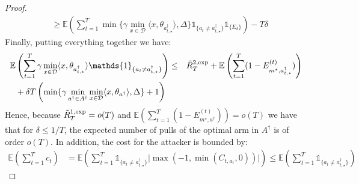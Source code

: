 \begin{proof}
\begin{align*}
    &\geq \mathbb{E}\left(\sum_{t=1}^{T} \min\{\gamma\min_{x\in\mathcal{D}} \langle x, \theta_{a^{\dagger}_{t,\star}}\rangle, \Delta\} \mathds{1}_{\{a_{t}\neq a^{\dagger}_{t,\star}\}}\mathds{1}_{\{E_{\delta}\}}\right)-T\delta
\end{align*}
Finally, putting everything together we have:
\begin{align*}
    \mathbb{E}&\left(\sum_{t=1}^{T} \gamma\min_{x\in\mathcal{D}} \langle x, \theta_{a^{\dagger}_{t,\star}}\rangle \mathds{1}_{\{a_{t}\neq a^{\dagger}_{t,\star}\}}\right) \leq &\Tilde{R}_{T}^{2,\text{exp}} + \mathbb{E}\left(\sum_{t=1}^{T}(1 - E_{m^{\star}, a^{\dagger}_{t,\star}}^{(t)})\right)\\
     &+ \delta T \left(\min\{\gamma\min_{a^{\dagger}\in A^{\dagger}}\min_{x\in\mathcal{D}} \langle x, \theta_{a^{\dagger}}\rangle, \Delta\} +1\right)
\end{align*}
Hence, because $\Tilde{R}_{T}^{1,\text{exp}} = o(T)$ and $\mathbb{E}\left(\sum_{t=1}^{T}(1 - E_{m^{\star}, a^{\dagger}}^{(t)})\right) = o(T)$ we have that for $\delta \leq 1/T$, the expected number of pulls of the optimal arm in $A^{\dagger}$ is of order $o(T)$. In addition, the cost for the attacker is bounded by: 
\begin{align*}
\mathbb{E}\left(\sum_{t=1}^{T} c_{t}\right) &= \mathbb{E}\left(\sum_{t=1}^{T} \mathds{1}_{\{a_{t}\neq a^{\dagger}_{t,\star}\}} \big|\max(-1, \min(C_{t, a_{t}},0))\big| \right)\leq  \mathbb{E}\left( \sum_{t=1}^{T} \mathds{1}_{\{a_{t}\neq a^{\dagger}_{t,\star}\}}\right)
\end{align*}
\end{proof}

